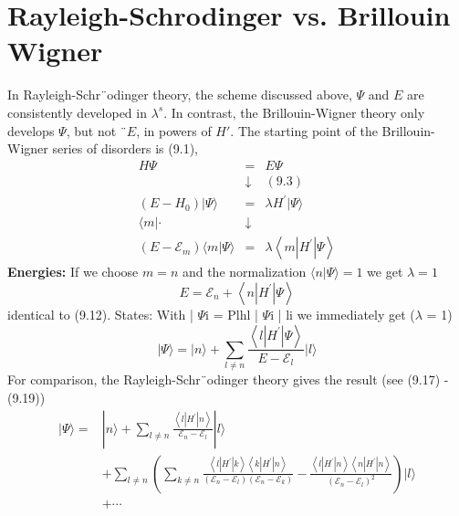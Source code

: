\section{Rayleigh-Schrodinger vs. Brillouin Wigner}
In Rayleigh-Schr¨odinger theory, the scheme discussed above, $\Psi$ and $E$ are consistently developed in $\lambda^s$. In contrast, the Brillouin-Wigner theory only develops $\Psi$, but not ¨$ E$, in powers of $H'$. The starting point of the Brillouin-Wigner series of disorders is (9.1),
\begin{equation}
\begin{array}{rcl} 
H \Psi &=&E \Psi \\ & \downarrow&(9.3) \\\left(E-H_{0}\right)|\Psi\rangle &=&\lambda H^{\prime}|\Psi\rangle \\\langle m| \cdot & \downarrow& \\\left(E-\mathcal{E}_{m}\right)\langle m | \Psi\rangle &=&\lambda\left\langle m\left|H^{\prime}\right| \Psi\right\rangle 
\end{array}
\end{equation}
\textbf{Energies:} If we choose $m = n$ and the normalization $\langle n | \Psi\rangle = 1$ we get $\lambda=1$
%
\begin{equation}
    E=\mathcal{E}_{n}+\left\langle n\left|H^{\prime}\right| \Psi\right\rangle
    \end{equation}
identical to (9.12).
States: With | $\Psi$i = Plhl | $\Psi$i | li we immediately get ($\lambda$ = 1)
\begin{equation}
    |\Psi\rangle=|n\rangle+\sum_{l \neq n} \frac{\left\langle l\left|H^{\prime}\right| \Psi\right\rangle}{E-\mathcal{E}_{l}}|l\rangle
    \end{equation}
For comparison, the Rayleigh-Schr¨odinger theory gives the result (see (9.17) - (9.19))
\begin{align}|\Psi\rangle=&|n\rangle+\sum_{l \neq n} \frac{\left\langle l\left|H^{\prime}\right| n\right\rangle}{\mathcal{E}_{n}-\mathcal{E}_{l}}|l\rangle \nonumber\\ &+\sum_{l \neq n}\left(\sum_{k \neq n} \frac{\left\langle l\left|H^{\prime}\right| k\right\rangle\left\langle k\left|H^{\prime}\right| n\right\rangle}{\left(\mathcal{E}_{n}-\mathcal{E}_{l}\right)\left(\mathcal{E}_{n}-\mathcal{E}_{k}\right)}-\frac{\left\langle l\left|H^{\prime}\right| n\right\rangle\left\langle n\left|H^{\prime}\right| n\right\rangle}{\left(\mathcal{E}_{n}-\mathcal{E}_{l}\right)^{2}}\right)|l\rangle \\ &+\cdots \end{align}

